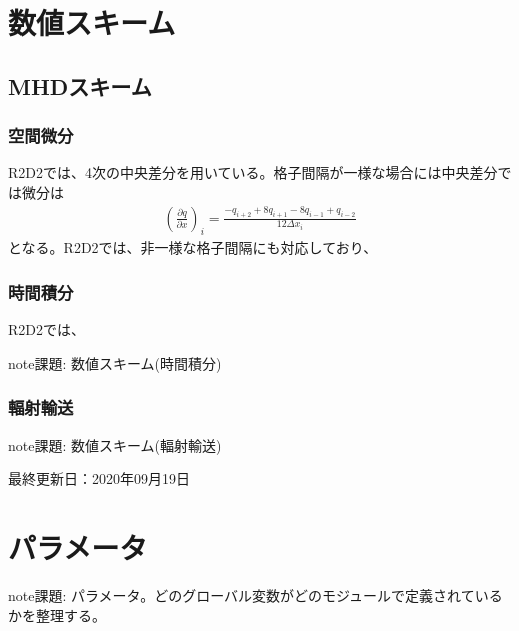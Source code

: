 \documentclass[letterpaper,10pt,dvipdfmx,report]{sphinxmanual}
\begin{document}
\chapter{数値スキーム}
\label{\detokenize{scheme:id1}}\label{\detokenize{scheme::doc}}

\section{MHDスキーム}
\label{\detokenize{scheme:mhd}}

\subsection{空間微分}
\label{\detokenize{scheme:id2}}
R2D2では、4次の中央差分を用いている。格子間隔が一様な場合には中央差分では微分は
\begin{equation*}
\begin{split}\left(\frac{\partial q}{\partial x}\right)_i =\frac{-q_{i+2}+8q_{i+1}-8q_{i-1}+q_{i-2}}{12\Delta x_i}\end{split}
\end{equation*}
となる。R2D2では、非一様な格子間隔にも対応しており、


\subsection{時間積分}
\label{\detokenize{scheme:id3}}
R2D2では、

\begin{sphinxadmonition}{note}{\label{\detokenize{scheme:id4}}課題:}
数値スキーム(時間積分)
\end{sphinxadmonition}


\subsection{輻射輸送}
\label{\detokenize{scheme:id5}}
\begin{sphinxadmonition}{note}{\label{\detokenize{scheme:id6}}課題:}
数値スキーム(輻射輸送)
\end{sphinxadmonition}

最終更新日：2020年09月19日


\chapter{パラメータ}
\label{\detokenize{parameter:id1}}\label{\detokenize{parameter::doc}}
\begin{sphinxadmonition}{note}{\label{\detokenize{parameter:id2}}課題:}
パラメータ。どのグローバル変数がどのモジュールで定義されているかを整理する。
\end{sphinxadmonition}
\end{document}
